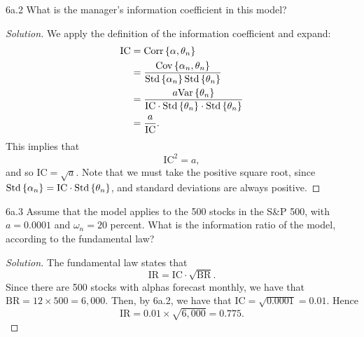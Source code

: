 \begin{problem}{6a.2}
What is the manager's information coefficient in this model?
\end{problem}
\begin{proof}[Solution]
We apply the definition of the information coefficient and expand:
\begin{align*}
\mathrm{IC} &= \mathrm{Corr}\left\lbrace\alpha, \theta_{n}\right\rbrace\\
&= \frac{\mathrm{Cov}\left\lbrace\alpha_{n}, \theta_{n}\right\rbrace}{\mathrm{Std}\left\lbrace\alpha_{n}\right\rbrace\mathrm{Std}\left\lbrace\theta_{n}\right\rbrace}\\
&= \frac{a\mathrm{Var}\left\lbrace\theta_{n}\right\rbrace}{\mathrm{IC} \cdot \mathrm{Std}\left\lbrace\theta_{n}\right\rbrace \cdot \mathrm{Std}\left\lbrace\theta_{n}\right\rbrace}\\
&= \frac{a}{\mathrm{IC}}.
\end{align*}
This implies that \[\mathrm{IC}^{2} = a,\] and so $\mathrm{IC} = \sqrt{a}$. Note that we must take the positive square root, since $\mathrm{Std}\left\lbrace\alpha_{n}\right\rbrace = \mathrm{IC}\cdot \mathrm{Std}\left\lbrace\theta_{n}\right\rbrace$, and standard deviations are always positive.
\end{proof}

\begin{problem}{6a.3}
Assume that the model applies to the 500 stocks in the S\&P 500, with $a = 0.0001$ and $\omega_{n} = 20$ percent. What is the information ratio of the model, according to the fundamental law?
\end{problem}
\begin{proof}[Solution]
The fundamental law states that \[\mathrm{IR} = \mathrm{IC} \cdot \sqrt{\mathrm{BR}}.\] Since there are 500 stocks with alphas forecast monthly, we have that $\mathrm{BR} = 12 \times 500 = 6{,}000$. Then, by 6a.2, we have that $\mathrm{IC} = \sqrt{0.0001} = 0.01$. Hence \[\mathrm{IR} = 0.01 \times \sqrt{6{,}000} = 0.775.\]
\end{proof}

